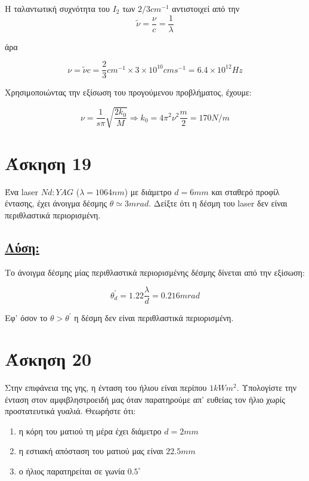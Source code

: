\documentclass[a4paper,11pt,titlepage]{article}
\newcommand{\degrees}{^{\circ}}
\numberwithin{equation}{section} %
\begin{document}
Η ταλαντωτική συχνότητα του $I_2$ των $2/3cm^{-1}$ αντιστοιχεί από την 
\begin{equation}
 \widetilde{\nu}=\frac{\nu}{c}=\frac{1}{\lambda}
\end{equation}

 άρα

\begin{equation}
 \nu=\widetilde{\nu}c=\frac{2}{3}cm^{-1}\times3\times10^{10}cm s^{-1}=6.4\times10^{12}Hz
\end{equation}

Χρησιμοποιώντας την εξίσωση του προγούμενου προβλήματος, έχουμε:

\begin{equation}
 \nu=\dfrac{1}{s\pi}\sqrt{\dfrac{2k_0}{M}}\Rightarrow k_0=4\pi^2\nu^2\dfrac{m}{2}=170N/m
\end{equation}

\section{Άσκηση 19}

Ένα laser $Nd:YAG$ ($\lambda=1064nm$) με διάμετρο $d=6mm$ και σταθερό προφίλ έντασης, έχει άνοιγμα δέσμης $\theta\simeq3mrad$. Δείξτε ότι η δέσμη του laser δεν είναι περιθλαστικά περιορισμένη.

\subsection*{\underline{Λύση:}}

Το άνοιγμα δέσμης μίας περιθλαστικά περιορισμένης δέσμης δίνεται από την εξίσωση:

\begin{equation}
 \theta^{'}_d=1.22\dfrac{\lambda}{d}=0.216mrad
\end{equation}

Εφ' όσον το $\theta>\theta^{'}$ η δέσμη δεν είναι περιθλαστικά περιορισμένη.
\newpage
\section{Άσκηση 20}

Στην επιφάνεια της γης, η ένταση του ήλιου είναι περίπου $1kWm^2$. Υπολογίστε την ένταση στον αμφιβληστροειδή μας όταν παρατηρούμε απ' ευθείας τον ήλιο χωρίς προστατευτικά γυαλιά. Θεωρήστε ότι:
\begin{enumerate}
 \item η κόρη του ματιού τη μέρα έχει διάμετρο $d=2mm$
 \item η εστιακή απόσταση του ματιού μας είναι $22.5mm$
 \item ο ήλιος παρατηρείται σε γωνία $0.5\degrees$
\end{enumerate}
\end{document}
